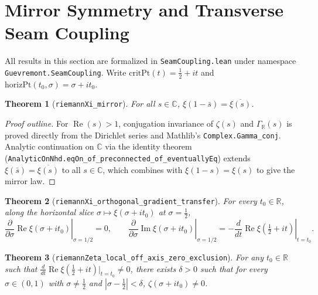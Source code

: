 \documentclass[11pt]{article}
\newtheorem{theorem}{Theorem}[section]
\theoremstyle{remark}
\begin{document}
\section{Mirror Symmetry and Transverse Seam Coupling}

All results in this section are formalized in \texttt{SeamCoupling.lean} under namespace \texttt{Guevremont.\allowbreak SeamCoupling}. Write $\mathrm{critPt}(t) = \frac{1}{2} + it$ and $\mathrm{horizPt}(t_0, \sigma) = \sigma + it_0$.

\begin{theorem}[\texttt{riemannXi\_\allowbreak mirror}]
For all $s \in \mathbb{C}$, $\xi(1 - \bar{s}) = \overline{\xi(s)}$.
\end{theorem}
\begin{proof}[Proof outline]
For $\operatorname{Re}(s) > 1$, conjugation invariance of $\zeta(s)$ and $\Gamma_{\mathbb{R}}(s)$ is proved directly from the Dirichlet series and Mathlib's \texttt{Complex.Gamma\_\allowbreak conj}. Analytic continuation on $\mathbb{C}$ via the identity theorem (\texttt{AnalyticOnNhd.eqOn\_\allowbreak of\_\allowbreak preconnected\_\allowbreak of\_\allowbreak eventuallyEq}) extends $\xi(\bar{s}) = \overline{\xi(s)}$ to all $s \in \mathbb{C}$, which combines with $\xi(1-s) = \xi(s)$ to give the mirror law.
\end{proof}

\begin{theorem}[\texttt{riemannXi\_\allowbreak orthogonal\_\allowbreak gradient\_\allowbreak transfer}]
For every $t_0 \in \mathbb{R}$, along the horizontal slice $\sigma \mapsto \xi(\sigma + it_0)$ at $\sigma = \frac{1}{2}$,
\[
\left.\frac{\partial}{\partial \sigma}\operatorname{Re}\xi(\sigma + it_0)\right|_{\sigma = 1/2} = 0,
\qquad
\left.\frac{\partial}{\partial \sigma}\operatorname{Im}\xi(\sigma + it_0)\right|_{\sigma = 1/2} = -\left.\frac{d}{dt}\operatorname{Re}\xi\!\left(\tfrac{1}{2} + it\right)\right|_{t = t_0}.
\]
\end{theorem}

\begin{theorem}[\texttt{riemannZeta\_\allowbreak local\_\allowbreak off\_\allowbreak axis\_\allowbreak zero\_\allowbreak exclusion}]
For any $t_0 \in \mathbb{R}$ such that $\frac{d}{dt}\operatorname{Re}\xi(\frac{1}{2}+it)\big|_{t=t_0} \neq 0$, there exists $\delta > 0$ such that for every $\sigma \in (0,1)$ with $\sigma \neq \frac{1}{2}$ and $|\sigma - \frac{1}{2}| < \delta$, $\zeta(\sigma + it_0) \neq 0$.
\end{theorem}
\end{document}
